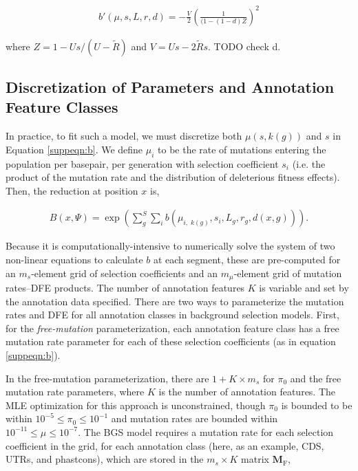 \documentclass[11pt]{article}
\begin{document}
\begin{align} 
    b'(\mu, s, L, r, d) = -\frac{V}{2} \left(\frac{1}{(1-(1-d)Z}\right)^2 
\end{align}

where $Z = 1 - Us / (U-\widetilde{R})$ and $V = Us - 2\widetilde{R}s$. TODO
check d.


\subsection{Discretization of Parameters and Annotation Feature Classes}

In practice, to fit such a model, we must discretize both $\mu(s, k(g))$ and
$s$ in Equation \eqref{suppeqn:b}. We define $\mu_i$ to be the rate of
mutations entering the population per basepair, per generation with selection
coefficient $s_i$ (i.e. the product of the mutation rate and the distribution
of deleterious fitness effects). Then, the reduction at position $x$ is,

\begin{align}
  \label{suppeqn:b}
  B(x, \Psi) = \exp \left( \sum_g^S \sum_{i} b\left( \mu_{i, \;k(g)}, s_i, L_g, r_g, d(x, g) \right)\right).
\end{align}


Because it is computationally-intensive to numerically solve the system of two
non-linear equations to calculate $b$ at each segment, these are pre-computed
for an $m_s$-element grid of selection coefficients and an $m_\mu$-element grid
of mutation rates--DFE products. The number of annotation features $K$ is
variable and set by the annotation data specified. There are two ways to
parameterize the mutation rates and DFE for all annotation classes in
background selection models. First, for the \emph{free-mutation}
parameterization, each annotation feature class has a free mutation rate
parameter for each of these selection coefficients (as in equation
\eqref{suppeqn:b}).

In the free-mutation parameterization, there are $1 + K \times m_s$ for $\pi_0$
and the free mutation rate parameters, where $K$ is the number of annotation
features. The MLE optimization for this approach is unconstrained, though
$\pi_0$ is bounded to be within $10^{-5} \le \pi_0 \le 10^{-1}$ and mutation
rates are bounded within $10^{-11} \le \mu \le 10^{-7}$. The BGS model requires
a mutation rate for each selection coefficient in the grid, for each annotation
class (here, as an example, CDS, UTRs, and phastcons), which are stored in the
$m_s \times K$ matrix $\mathbf{M}_\text{F}$,
\end{document}
